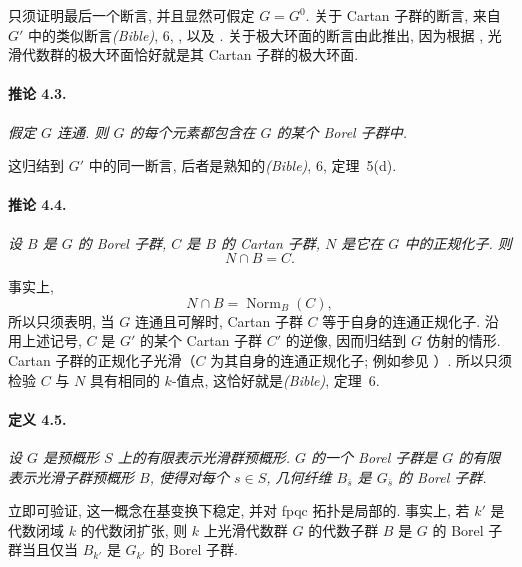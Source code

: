 只须证明最后一个断言, 并且显然可假定 \(G=G^0\). 关于 Cartan 子群的断言, 来自 \(G'\) 中的类似断言\textup{\emph{(Bible)}, 6, , } 以及 \textup{}. 关于极大环面的断言由此推出, 因为根据 \textup{}, 光滑代数群的极大环面恰好就是其 Cartan 子群的极大环面.

\paragraph{\textbf{推论 4.3.}}
{\itshape 假定 \(G\) 连通. 则 \(G\) 的每个元素都包含在 \(G\) 的某个 Borel 子群中.}

这归结到 \(G'\) 中的同一断言, 后者是熟知的\textup{\emph{(Bible)}, 6, 定理~5\textup{(d)}}.

\paragraph{\textbf{推论 4.4.}}
{\itshape 设 \(B\) 是 \(G\) 的 Borel 子群, \(C\) 是 \(B\) 的 Cartan 子群, \(N\) 是它在 \(G\) 中的正规化子. 则
\[
  N\cap B=C.
\]}

事实上,
\[
  N\cap B=\operatorname{Norm}_B(C),
\]
所以只须表明, 当 \(G\) 连通且可解时, Cartan 子群 \(C\) 等于自身的连通正规化子. 沿用上述记号, \(C\) 是 \(G'\) 的某个 Cartan 子群 \(C'\) 的逆像, 因而归结到 \(G\) 仿射的情形. Cartan 子群的正规化子光滑\textup{（\(C\) 为其自身的连通正规化子; 例如参见 \textup{}）}. 所以只须检验 \(C\) 与 \(N\) 具有相同的 \(k\)-值点, 这恰好就是\textup{\emph{(Bible)}, 定理~6\textup{}}.

\paragraph{\textbf{定义 4.5.}}
{\itshape 设 \(G\) 是预概形 \(S\) 上的有限表示光滑群预概形. \(G\) 的一个 \emph{Borel 子群}是 \(G\) 的有限表示光滑子群预概形 \(B\), 使得对每个 \(s\in S\), 几何纤维 \(B_{\bar s}\) 是 \(G_{\bar s}\) 的 Borel 子群.}

立即可验证, 这一概念在基变换下稳定, 并对 fpqc 拓扑是局部的. 事实上, 若 \(k'\) 是代数闭域 \(k\) 的代数闭扩张, 则 \(k\) 上光滑代数群 \(G\) 的代数子群 \(B\) 是 \(G\) 的 Borel 子群当且仅当 \(B_{k'}\) 是 \(G_{k'}\) 的 Borel 子群.

